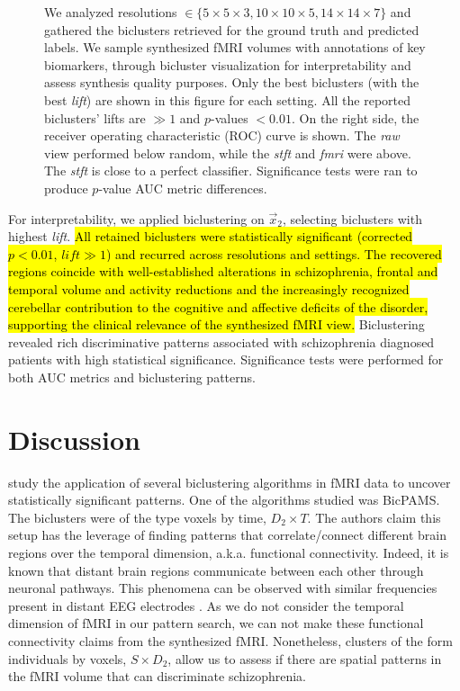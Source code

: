 \documentclass{article}
\begin{document}
\begin{figure}[t]
\begin{tikzpicture}
    \end{tikzpicture}
    \caption{We analyzed resolutions $\in \{5\times 5\times 3, 10 \times 10 \times 5, 14 \times 14 \times 7\}$ and gathered the biclusters retrieved for the ground truth and predicted labels. We sample synthesized fMRI volumes with annotations of key biomarkers, through bicluster visualization for interpretability and assess synthesis quality purposes. Only the best biclusters (with the best \textit{lift}) are shown in this figure for each setting. All the reported biclusters' lifts are $\gg 1$ and $p$-values $<0.01$. On the right side, the receiver operating characteristic (ROC) curve is shown. The \textit{raw} view performed below random, while the \textit{stft} and \textit{fmri} were above. The \textit{stft} is close to a perfect classifier. Significance tests were ran to produce $p$-value AUC metric differences.} 
    \label{fig:results_compact}
\end{figure}

For interpretability, we applied biclustering on $\vec{x}_2$, selecting biclusters with highest \textit{lift}. \hl{All retained biclusters were statistically significant (corrected $p < 0.01$, $lift \gg 1$) and recurred across resolutions and settings. The recovered regions coincide with well-established alterations in schizophrenia, frontal and temporal volume and activity reductions and the increasingly recognized cerebellar contribution to the cognitive and affective deficits of the disorder, supporting the clinical relevance of the synthesized fMRI view.} Biclustering revealed rich discriminative patterns associated with schizophrenia diagnosed patients with high statistical significance. Significance tests were performed for both AUC metrics and biclustering patterns.

\section{Discussion}\label{section:discussion}


\citet{castanho2022biclustering} study the application of several biclustering algorithms in fMRI data to uncover statistically significant patterns. One of the algorithms studied was BicPAMS. The biclusters were of the type voxels by time, $D_2 \times T$. The authors claim this setup has the leverage of finding patterns that correlate/connect different brain regions over the temporal dimension, a.k.a. functional connectivity. Indeed, it is known that distant brain regions communicate between each other through neuronal pathways. This phenomena can be observed with similar frequencies present in distant EEG electrodes \cite{pfurtscheller1999event}. As we do not consider the temporal dimension of fMRI in our pattern search, we can not make these functional connectivity claims from the synthesized fMRI. Nonetheless, clusters of the form individuals by voxels, $S \times D_2$, allow us to assess if there are spatial patterns in the fMRI volume that can discriminate schizophrenia.
\end{document}
